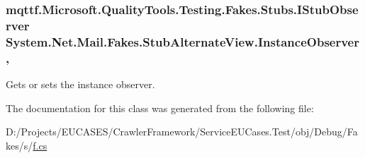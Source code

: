 \hypertarget{class_system_1_1_net_1_1_mail_1_1_fakes_1_1_stub_alternate_view_a4a91c6ea908d9aaa974e43a61eebfcf9}{
\subsubsection[{Instance\-Observer}]{\setlength{\rightskip}{0pt plus 5cm}mqttf.\-Microsoft.\-Quality\-Tools.\-Testing.\-Fakes.\-Stubs.\-I\-Stub\-Observer System.\-Net.\-Mail.\-Fakes.\-Stub\-Alternate\-View.\-Instance\-Observer\hspace{0.3cm}{\ttfamily [get]}, {\ttfamily [set]}}}\label{class_system_1_1_net_1_1_mail_1_1_fakes_1_1_stub_alternate_view_a4a91c6ea908d9aaa974e43a61eebfcf9}


Gets or sets the instance observer.



The documentation for this class was generated from the following file\-:\begin{DoxyCompactItemize}
\item 
D\-:/\-Projects/\-E\-U\-C\-A\-S\-E\-S/\-Crawler\-Framework/\-Service\-E\-U\-Cases.\-Test/obj/\-Debug/\-Fakes/s/\hyperlink{s_2f_8cs}{f.\-cs}\end{DoxyCompactItemize}
